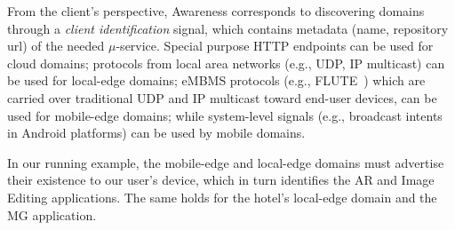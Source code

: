 
%	
%	




From the client's perspective, Awareness corresponds to discovering domains through a \textit{client identification} signal, which contains metadata (name, repository url) of the needed $\mu$-service. Special purpose HTTP endpoints can be used for cloud domains; protocols from local area networks (e.g., UDP, IP multicast) can be used for local-edge domains; eMBMS protocols (e.g., FLUTE~\cite{lecompte2012evolved}) which are carried over traditional UDP and IP multicast toward end-user devices, can be used for mobile-edge domains; while system-level signals (e.g., broadcast intents in Android platforms) can be used by mobile domains.

In our running example, the mobile-edge and local-edge domains must advertise their existence to our user's device, which in turn identifies the AR and Image Editing applications. The same holds for the hotel's local-edge domain and the MG application. %


%
%	
%	



